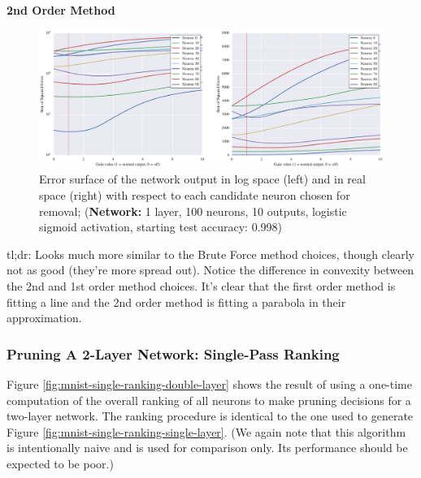 \textbf{2nd Order Method}
\begin{figure}[!h]
\centering
\includegraphics[width=\linewidth]{png/mnist-acc99-g1-gain.pdf}
\caption{Error surface of the network output in log space (left) and in real space (right) with respect to each candidate neuron chosen for removal; (\textbf{Network:} 1 layer, 100 neurons, 10 outputs, logistic sigmoid activation, starting test accuracy: 0.998)}
\label{fig:mnist-gt-single-layer}
\end{figure}
tl;dr: Looks much more similar to the Brute Force method choices, though clearly not as good (they're more spread out). Notice the difference in convexity between the 2nd and 1st order method choices. It's clear that the first order method is fitting a line and the 2nd order method is fitting a parabola in their approximation. 

\subsubsection{Pruning A 2-Layer Network: Single-Pass Ranking}
Figure \ref{fig:mnist-single-ranking-double-layer} shows the result of using a one-time computation of the overall ranking of all neurons to make pruning decisions for a two-layer network. The ranking procedure is identical to the one used to generate Figure \ref{fig:mnist-single-ranking-single-layer}. (We again note that this algorithm is intentionally naive and is used for comparison only. Its performance should be expected to be poor.) 

